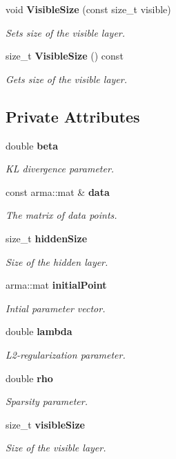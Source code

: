 \begin{DoxyCompactItemize}
void {\bf Visible\-Size} (const size\-\_\-t visible)
\begin{DoxyCompactList}\small\item\em Sets size of the visible layer. \end{DoxyCompactList}\item 
size\-\_\-t {\bf Visible\-Size} () const 
\begin{DoxyCompactList}\small\item\em Gets size of the visible layer. \end{DoxyCompactList}\end{DoxyCompactItemize}
\subsection*{Private Attributes}
\begin{DoxyCompactItemize}
\item 
double {\bf beta}
\begin{DoxyCompactList}\small\item\em K\-L divergence parameter. \end{DoxyCompactList}\item 
const arma\-::mat \& {\bf data}
\begin{DoxyCompactList}\small\item\em The matrix of data points. \end{DoxyCompactList}\item 
size\-\_\-t {\bf hidden\-Size}
\begin{DoxyCompactList}\small\item\em Size of the hidden layer. \end{DoxyCompactList}\item 
arma\-::mat {\bf initial\-Point}
\begin{DoxyCompactList}\small\item\em Intial parameter vector. \end{DoxyCompactList}\item 
double {\bf lambda}
\begin{DoxyCompactList}\small\item\em L2-\/regularization parameter. \end{DoxyCompactList}\item 
double {\bf rho}
\begin{DoxyCompactList}\small\item\em Sparsity parameter. \end{DoxyCompactList}\item 
size\-\_\-t {\bf visible\-Size}
\begin{DoxyCompactList}\small\item\em Size of the visible layer. \end{DoxyCompactList}\end{DoxyCompactItemize}


